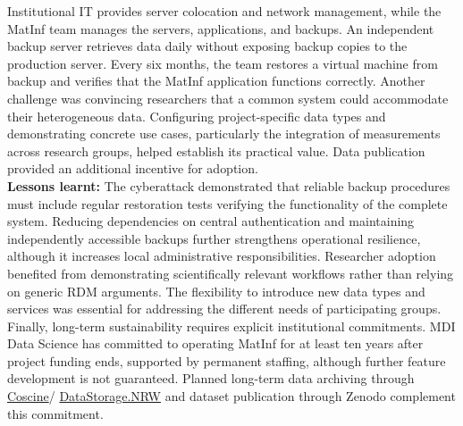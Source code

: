 \documentclass{eceasst}
\begin{document}
Institutional IT provides server colocation and network management, while the MatInf team manages the servers, applications, and backups.
An independent backup server retrieves data daily
without exposing backup copies to the production
server. Every six months, the team restores a virtual machine from backup and verifies that the MatInf application functions correctly.
Another challenge was convincing researchers that
a common system could accommodate their heterogeneous
data. Configuring project-specific data types and
demonstrating concrete use cases, particularly the
integration of measurements across research groups, helped establish its practical value.
Data publication provided an additional incentive for adoption.
\\
\noindent\textbf{Lessons learnt:}
The cyberattack demonstrated that reliable backup
procedures must include regular restoration tests
verifying the functionality of the complete system.
Reducing dependencies on central authentication and
maintaining independently accessible backups further
strengthens operational resilience, although it
increases local administrative responsibilities.
Researcher adoption benefited from demonstrating
scientifically relevant workflows rather than relying
on generic RDM arguments. The flexibility to introduce
new data types and services was essential for addressing
the different needs of participating groups.
Finally, long-term sustainability requires explicit
institutional commitments. MDI Data Science has
committed to operating MatInf for at least ten years
after project funding ends, supported by permanent
staffing, although further feature development is
not guaranteed.
Planned long-term data archiving through
\href{https://about.coscine.de/}{Coscine}/
\href{https://www.datastorage.nrw/}{DataStorage.NRW}
and dataset publication through Zenodo complement this commitment.
\end{document}
